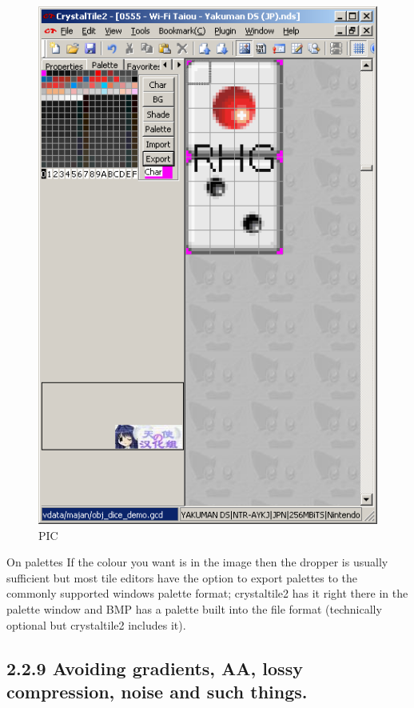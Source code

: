 \documentclass[
]{book}
\begin{document}
\begin{figure}
\centering
\includegraphics{images/29_home_fast6191_romhackingguide_unrenamed_file____borders_romhackingguidecrystaltile2export4.png}
\caption{PIC}
\end{figure}

On palettes If the colour you want is in the image then the dropper is usually sufficient but most tile editors have the option to export palettes to the commonly supported windows palette format; crystaltile2 has it right there in the palette window and BMP has a palette built into the file format (technically optional but crystaltile2 includes it).

\hypertarget{avoiding-gradients-aa-lossy-compression-noise-and-such-things.}{%
\subsection{2.2.9 Avoiding gradients, AA, lossy compression, noise and such things.}\label{avoiding-gradients-aa-lossy-compression-noise-and-such-things.}}
\end{document}
